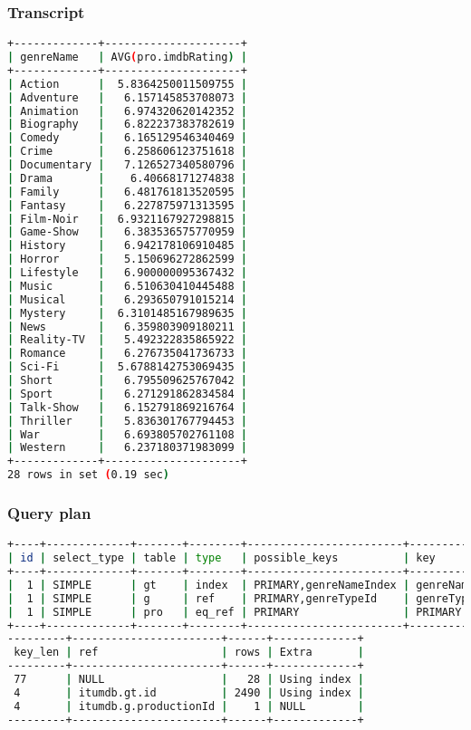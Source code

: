 \subsubsection{Transcript}
\begin{lstlisting}[language=bash]
+-------------+---------------------+
| genreName   | AVG(pro.imdbRating) |
+-------------+---------------------+
| Action      |  5.8364250011509755 |
| Adventure   |   6.157145853708073 |
| Animation   |   6.974320620142352 |
| Biography   |   6.822237383782619 |
| Comedy      |   6.165129546340469 |
| Crime       |   6.258606123751618 |
| Documentary |   7.126527340580796 |
| Drama       |    6.40668171274838 |
| Family      |   6.481761813520595 |
| Fantasy     |   6.227875971313595 |
| Film-Noir   |  6.9321167927298815 |
| Game-Show   |   6.383536575770959 |
| History     |   6.942178106910485 |
| Horror      |   5.150696272862599 |
| Lifestyle   |   6.900000095367432 |
| Music       |   6.510630410445488 |
| Musical     |   6.293650791015214 |
| Mystery     |  6.3101485167989635 |
| News        |   6.359803909180211 |
| Reality-TV  |   5.492322835865922 |
| Romance     |   6.276735041736733 |
| Sci-Fi      |  5.6788142753069435 |
| Short       |   6.795509625767042 |
| Sport       |   6.271291862834584 |
| Talk-Show   |   6.152791869216764 |
| Thriller    |   5.836301767794453 |
| War         |   6.693805702761108 |
| Western     |   6.237180371983099 |
+-------------+---------------------+
28 rows in set (0.19 sec)
\end{lstlisting}

\subsubsection{Query plan}
\begin{lstlisting}[language=bash]
+----+-------------+-------+--------+------------------------+----------------+
| id | select_type | table | type   | possible_keys          | key            |
+----+-------------+-------+--------+------------------------+----------------+
|  1 | SIMPLE      | gt    | index  | PRIMARY,genreNameIndex | genreNameIndex |
|  1 | SIMPLE      | g     | ref    | PRIMARY,genreTypeId    | genreTypeId    |
|  1 | SIMPLE      | pro   | eq_ref | PRIMARY                | PRIMARY        |
+----+-------------+-------+--------+------------------------+----------------+
---------+-----------------------+------+-------------+
 key_len | ref                   | rows | Extra       |
---------+-----------------------+------+-------------+
 77      | NULL                  |   28 | Using index |
 4       | itumdb.gt.id          | 2490 | Using index |
 4       | itumdb.g.productionId |    1 | NULL        |
---------+-----------------------+------+-------------+
\end{lstlisting}

